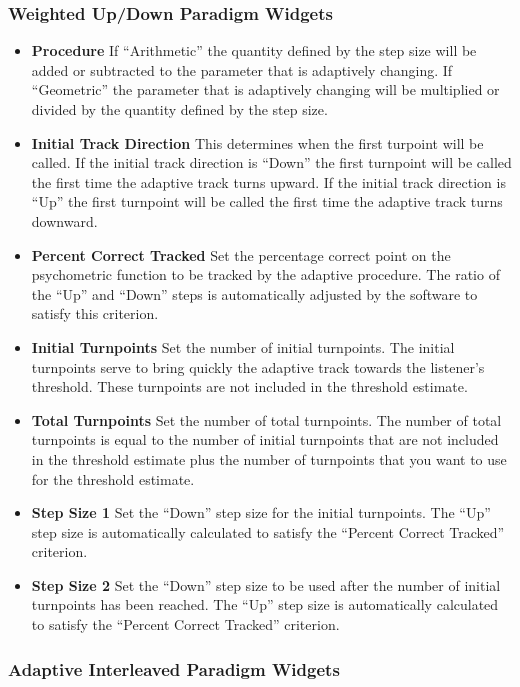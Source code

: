 \subsubsection{Weighted Up/Down Paradigm Widgets}

\begin{itemize}
\item \textbf{Procedure} If ``Arithmetic'' the quantity defined by the step size will be added or subtracted to the parameter that is adaptively changing. 
  If ``Geometric'' the parameter that is adaptively changing will be multiplied or divided by the quantity defined by the step size.
\item \textbf{Initial Track Direction} This determines when the first turpoint will be called. If the initial track direction is ``Down'' the first turnpoint will be called
  the first time the adaptive track turns upward. If the initial track direction is ``Up'' the first turnpoint will be called
  the first time the adaptive track turns downward.
\item \textbf{Percent Correct Tracked} Set the percentage correct point on the psychometric function to be tracked by the adaptive procedure. The ratio of the ``Up'' and ``Down'' steps
  is automatically adjusted by the software to satisfy this criterion.
\item \textbf{Initial Turnpoints} Set the number of initial turnpoints. The initial turnpoints serve to bring quickly the adaptive track towards the listener's threshold.
  These turnpoints are not included in the threshold estimate. 
\item \textbf{Total Turnpoints} Set the number of total turnpoints. The number of total turnpoints is equal to the number of initial turnpoints that are not included in the threshold estimate
  plus the number of turnpoints that you want to use for the threshold estimate.
\item \textbf{Step Size 1} Set the ``Down'' step size for the initial turnpoints. The ``Up'' step size is automatically calculated to satisfy the ``Percent Correct Tracked'' criterion.
\item \textbf{Step Size 2} Set the ``Down'' step size to be used after the number of initial turnpoints has been reached. The ``Up'' step size is automatically calculated to satisfy the ``Percent Correct Tracked'' criterion.
\end{itemize}
\subsubsection{Adaptive Interleaved Paradigm Widgets}

